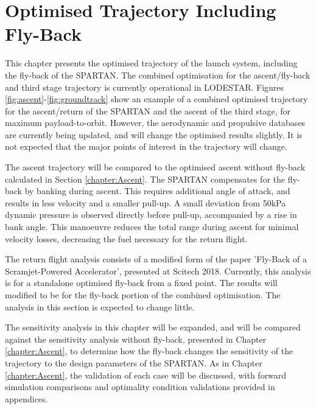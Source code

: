 
\cleardoublepage
\chapter{Optimised Trajectory Including Fly-Back}\label{chapter:Flyback}

This chapter presents the optimised trajectory of the launch system, including the fly-back of the SPARTAN. The combined optimisation for the ascent/fly-back and third stage trajectory is currently operational in LODESTAR. Figures \ref{fig:ascent}-\ref{fig:groundtrack} show an example of a combined optimised trajectory for the ascent/return of the SPARTAN and the ascent of the third stage, for maximum payload-to-orbit. However, the aerodynamic and propulsive databases are currently being updated, and will change the optimised results slightly. It is not expected that the major points of interest in the trajectory will change.



 The ascent trajectory will be compared to the optimised ascent without fly-back calculated in Section \ref{chapter:Ascent}. The SPARTAN compensates for the fly-back by banking during ascent. This requires additional angle of attack, and results in less velocity and a smaller pull-up. A small deviation from 50kPa dynamic pressure is observed directly before pull-up, accompanied by a rise in bank angle. This manoeuvre reduces the total range during ascent for minimal velocity losses, decreasing the fuel necessary for the return flight. 
 

The return flight analysis consists of a modified form of the paper 'Fly-Back of a Scramjet-Powered Accelerator', presented at Scitech 2018. Currently, this analysis is for a standalone optimised fly-back from a fixed point.  The results will modified to be for the fly-back portion of the combined optimisation. The analysis in this section is expected to change little. 



The sensitivity analysis in this chapter will be expanded, and will be compared against the sensitivity analysis without fly-back, presented in Chapter \ref{chapter:Ascent}, to determine how the fly-back changes the sensitivity of the trajectory to the design parameters of the SPARTAN. As in Chapter \ref{chapter:Ascent}, the validation of each case will be discussed, with forward simulation comparisons and optimality condition validations provided in appendices. 




